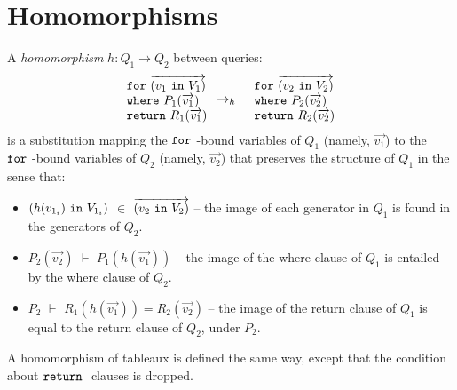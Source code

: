 \documentclass{sigplanconf}
\newcommand{\FOR}{{\tt for}\relax\ifmmode\ \else\xspace\fi}
\newcommand{\WHERE}{{\tt where}\relax\ifmmode\ \else\xspace\fi}
\newcommand{\IN}{ \ {\tt in} \ }
\newcommand{\RETURN}{{\tt return}\relax\ifmmode\ \else\xspace\fi}
\begin{document}
\section{Homomorphisms}

A {\it homomorphism} $h : Q_1 \to Q_2$ between queries:
\begin{eqnarray*}
\begin{array}{l}
\FOR \overrightarrow{(v_1 \IN V_1)} \\
\WHERE P_1(\overrightarrow{v_1}) \\
\RETURN R_1(\overrightarrow{v_1})
\end{array} & \to_h &
\begin{array}{l}
\FOR \overrightarrow{(v_2 \IN V_2)} \\
\WHERE P_2(\overrightarrow{v_2}) \\
\RETURN R_2(\overrightarrow{v_2})
\end{array}
\end{eqnarray*}
is a substitution mapping the $\FOR$-bound variables of $Q_1$ (namely, $
\overrightarrow{v_1}$) to the $\FOR$-bound variables of $Q_2$ (namely, $
\overrightarrow{v_2}$) that preserves the structure of $Q_1$ in the sense that:
\begin{itemize}
\item  
 $(h(v_{1_i}) \IN V_{1_i})$ $ \in$ $\overrightarrow{(v_2 \IN V_2)}$ -- the image of each generator in $Q_1$ is found in the generators of $Q_2$. 

\item $P_2(\overrightarrow{v_2})$ $\vdash$ $P_1(h(\overrightarrow{v_1}))$ -- the image of the where clause of $Q_1$ is entailed by the where clause of $Q_2$.

\item $P_2$ $\vdash$ $R_1(h(\overrightarrow{v_1})) = R_2(\overrightarrow{v_2})$ -- the image of the return clause of $Q_1$ is equal to the return clause of $Q_2$, under $P_2$.
\end{itemize}
A homomorphism of tableaux is defined the same way, except that the condition about $\RETURN$ clauses is dropped.  
\end{document}
